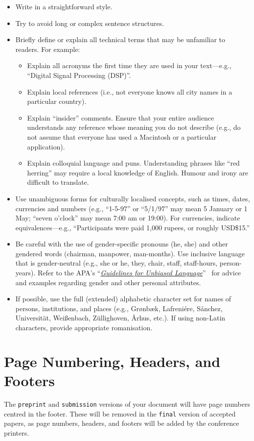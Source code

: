 \documentclass[preprint]{../latex/sigchi-modern}
\begin{document}
\begin{itemize}
\item Write in a straightforward style.
\item Try to avoid long or complex sentence structures.
\item Briefly define or explain all technical terms that may be unfamiliar to
  readers. For example:
  \begin{itemize}
    \item Explain all acronyms the first time they are used in your text---e.g.,
      ``Digital Signal Processing (DSP)''.
    \item Explain local references (i.e., not everyone knows all city names in a
      particular country).
    \item Explain ``insider'' comments. Ensure that your entire audience
      understands any reference whose meaning you do not describe (e.g., do not
      assume that everyone has used a Macintosh or a particular application).
    \item Explain colloquial language and puns. Understanding phrases like ``red
      herring'' may require a local knowledge of English. Humour and irony are
      difficult to translate.
  \end{itemize}
\item Use unambiguous forms for culturally localised concepts, such as times,
  dates, currencies and numbers (e.g., ``1-5-97'' or ``5/1/97'' may mean 5
  January or 1 May; ``seven o'clock'' may mean 7:00 am or 19:00). For
  currencies, indicate equivalences---e.g., ``Participants were paid 1,000
  rupees, or roughly USD\$15.''
\item Be careful with the use of gender-specific pronouns (he, she) and other
  gendered words (chairman, manpower, man-months). Use inclusive language that
  is gender-neutral (e.g., she or he, they, chair, staff, staff-hours,
  person-years). Refer to the APA's
  ``\href{http://supp.apa.org/style/pubman-ch03.00.pdf}{\it Guidelines for 
  Unbiased Language}''~\cite{apa} for advice and examples regarding  gender and
  other personal attributes.
\item If possible, use the full (extended) alphabetic character set for names of
  persons, institutions, and places (e.g., Gr{\o}nb{\ae}k, Lafreni\'ere,
  S\'anchez, Universit{\"a}t, Wei{\ss}enbach, Z{\"u}llighoven, \r{A}rhus, etc.).
  If using non-Latin characters, provide appropriate romanisation.
\end{itemize}

\section{Page Numbering, Headers, and Footers}
The \texttt{preprint} and \texttt{submission} versions of your document will
have page numbers centred in the footer. These will be removed in the
\texttt{final} version of accepted papers, as page numbers, headers, and footers
will be added by the conference printers.
\end{document}
